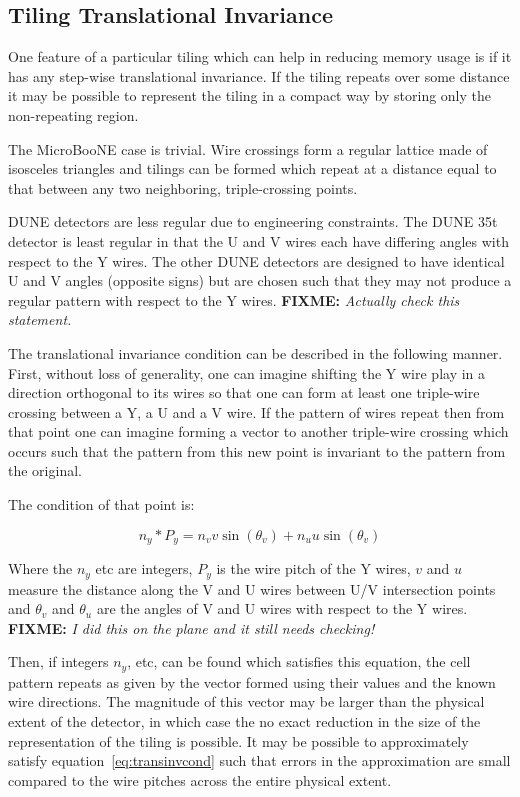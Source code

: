 \documentclass[letter]{article}
\newcommand\fixme[1]{\textbf{FIXME:} \textit{#1}\xspace}
\begin{document}
\subsection{Tiling Translational Invariance}

One feature of a particular tiling which can help in reducing memory
usage is if it has any step-wise translational invariance.
If the tiling repeats over some distance it may be possible to
represent the tiling in a compact way by storing only the
non-repeating region.

The MicroBooNE case is trivial.
Wire crossings form a regular lattice made of isosceles triangles and
tilings can be formed which repeat at a distance equal to that between
any two neighboring, triple-crossing points.

DUNE detectors are less regular due to engineering constraints.
The DUNE 35t detector is least regular in that the U and V wires each have
differing angles with respect to the Y wires.
The other DUNE detectors are designed to have identical U and V angles
(opposite signs)
but are chosen such that they may not produce a regular pattern with
respect to the Y wires.
\fixme{Actually check this statement.}


The translational invariance condition can be described in the
following manner.
First, without loss of generality, one can imagine shifting the Y wire
play in a direction orthogonal to its wires so that one can form at
least one triple-wire crossing between a Y, a U and a V wire.
If the pattern of wires repeat then from that point one can imagine
forming a vector to another triple-wire crossing which occurs such
that the pattern from this new point is invariant to the pattern from
the original.

The condition of that point is:

\begin{equation}
  \label{eq:transinvcond}
  n_y*P_y = n_v v \sin(\theta_v) + n_u u \sin(\theta_v)
\end{equation}

Where the $n_y$ etc are integers, $P_y$ is the wire pitch of the Y
wires, $v$ and $u$ measure the distance along the V and U wires
between U/V intersection points and $\theta_v$ and $\theta_u$ are the
angles of V and U wires with respect to the Y wires.
\fixme{I did this
  on the plane and it still needs checking!}
  
Then, if integers $n_y$, etc, can be found which satisfies this
equation, the cell pattern repeats as given by the vector formed using
their values and the known wire directions.
The magnitude of this vector may be larger than the physical extent of
the detector, in which case the no exact reduction in the size of the
representation of the tiling is possible.
It may be possible to approximately satisfy
equation~\ref{eq:transinvcond} such that errors in the approximation
are small compared to the wire pitches across the entire physical extent.
\end{document}
